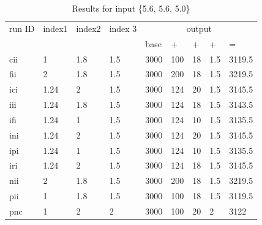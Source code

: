 \documentclass[11pt,fleqn]{report}
\begin{document}
\begin{table}[ht]
\caption{Results for input \{5.6, 5.6, 5.0\}}
\begin{center}
\begin{tabular}{|l||l|l|l||llll|l|}
\hline
run ID & index1 & index2 & index 3 & \multicolumn{5}{c|}{output} \\
       &        &        &         & base &  +  & +  &   + &   =      \\ \hline \hline
cii    & 1      & 1.8    & 1.5     & 3000 & 100 & 18 & 1.5 & 3119.5 \\ \hline
fii    & 2      & 1.8    & 1.5     & 3000 & 200 & 18 & 1.5 & 3219.5 \\ \hline
ici    & 1.24   & 2      & 1.5     & 3000 & 124 & 20 & 1.5 & 3145.5 \\ \hline
iii    & 1.24   & 1.8    & 1.5     & 3000 & 124 & 18 & 1.5 & 3143.5 \\ \hline
ifi    & 1.24   & 1      & 1.5     & 3000 & 124 & 10 & 1.5 & 3135.5 \\ \hline
ini    & 1.24   & 2      & 1.5     & 3000 & 124 & 20 & 1.5 & 3145.5 \\ \hline
ipi    & 1.24   & 1      & 1.5     & 3000 & 124 & 10 & 1.5 & 3135.5 \\ \hline
iri    & 1.24   & 2      & 1.5     & 3000 & 124 & 18 & 1.5 & 3145.5 \\ \hline
nii    & 2      & 1.8    & 1.5     & 3000 & 200 & 18 & 1.5 & 3219.5 \\ \hline
pii    & 1      & 1.8    & 1.5     & 3000 & 100 & 18 & 1.5 & 3119.5 \\ \hline
pnc    & 1      & 2      & 2       & 3000 & 100 & 20 & 2   & 3122   \\ \hline
\hline
\end{tabular}
\end{center}
\end{table}
\end{document}
